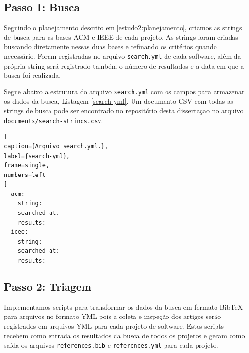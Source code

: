 \subsection{Passo 1: Busca}

Seguindo o planejamento descrito em \ref{estudo2:planejamento}, criamos as
strings de busca para as bases ACM e IEEE de cada projeto. As strings foram
criadas buscando diretamente nessas duas bases e refinando os critérios quando
necessário. Foram registradas no arquivo \texttt{search.yml} de cada software,
além da própria string será registrado também o número de resultados e a data
em que a busca foi realizada.


Segue abaixo a estrutura do arquivo \texttt{search.yml} com os campos para
armazenar os dados da busca, Listagem \ref{search-yml}.  Um documento
CSV com todas as strings de busca pode ser encontrado no repositório desta
dissertaçao no arquivo \texttt{documents/search-strings.csv}.


\begin{lstlisting}[
caption={Arquivo search.yml.},
label={search-yml},
frame=single,
numbers=left
]
  acm:
    string:
    searched_at:
    results:
  ieee:
    string:
    searched_at:
    results:
\end{lstlisting}

\subsection{Passo 2: Triagem}

Implementamos scripts para transformar os dados da busca em formato BibTeX para
arquivos no formato YML pois a coleta e inspeção dos artigos serão registrados
em arquivos YML para cada projeto de software. Estes scripts recebem como entrada
os resultados da busca de todos os projetos e geram como saída os arquivos \texttt{references.bib}
e \texttt{references.yml} para cada projeto.

